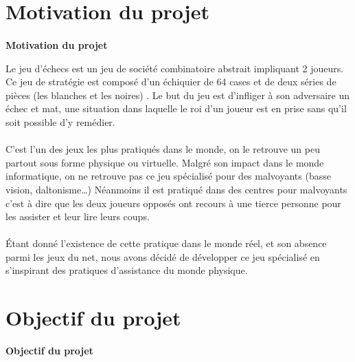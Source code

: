 \documentclass[12pt, openany]{report}
\begin{document}
\section{Motivation du projet}

\paragraph{}
\textbf{Motivation du projet}
\newline\newline

Le jeu d'échecs est un jeu de société combinatoire abstrait impliquant 2 joueurs. Ce jeu de stratégie est composé d'un échiquier de 64 cases et de deux séries de pièces (les blanches et les noires) .
Le but du jeu est d'infliger à son adversaire un échec et mat, une situation dans laquelle le roi d'un joueur est en prise sans qu'il soit possible d'y remédier.

\paragraph{}
C’est l’un des jeux les plus pratiqués dans le monde, on le retrouve un peu partout sous forme physique ou virtuelle.
\newline
Malgré son impact dans le monde informatique, on ne retrouve pas ce jeu spécialisé pour des malvoyants (basse vision, daltonisme…)\newline
Néanmoins il est pratiqué dans des centres pour malvoyants c’est à dire que les deux joueurs opposés ont recours à une tierce personne pour les assister et leur lire leurs coups.

\paragraph{}
Étant donné l’existence de cette pratique dans le monde réel, et son absence parmi les jeux du net, 
 nous avons décidé de développer ce jeu spécialisé en s'inspirant des pratiques d'assistance du monde physique.
 
 
\section{Objectif du projet}

\textbf{Objectif du projet}

\paragraph{}
\end{document}
